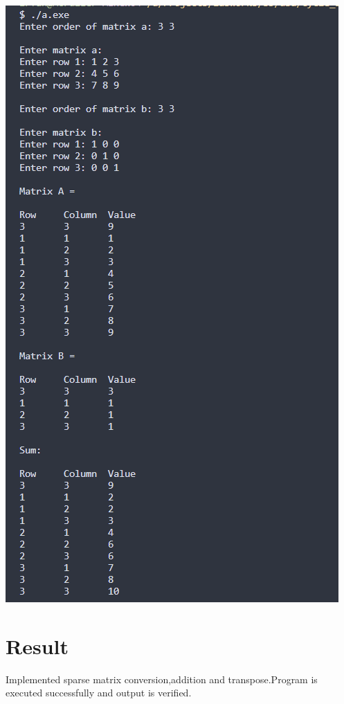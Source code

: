 \includegraphics[]{Cycle_1/Outputs/SparseMatrix.png}

\section{Result}
Implemented sparse matrix conversion,addition and transpose.Program is executed successfully and output is verified.